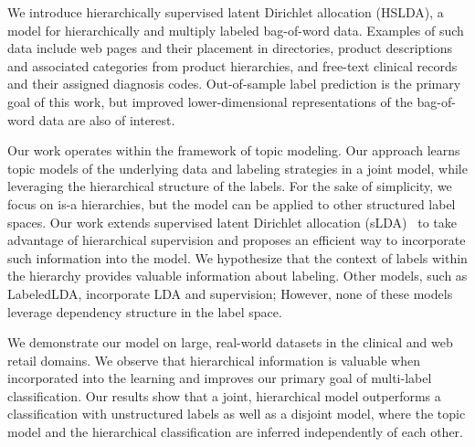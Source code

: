 

We introduce hierarchically supervised latent Dirichlet allocation (HSLDA), a
model for hierarchically and multiply labeled bag-of-word data.  Examples of
such data include web pages and their placement in directories, product
descriptions and associated categories from product hierarchies, and free-text
clinical records and their assigned diagnosis codes. Out-of-sample label
prediction is the primary goal of this work, but improved lower-dimensional
representations of the bag-of-word data are also of interest.

Our work operates within the framework of topic modeling. Our approach learns
topic models of the underlying data and labeling strategies in a joint model,
while leveraging the hierarchical structure of the labels. For the sake of
simplicity, we focus on is-a hierarchies, but the model can be
applied to other structured label spaces. Our work extends supervised latent Dirichlet
allocation (sLDA)~\cite{BleiMcAuliffe2008} to take advantage of hierarchical
supervision and proposes an efficient way to incorporate such information into the model. 
We hypothesize that the context of labels within
the hierarchy provides valuable information about labeling. Other models, such as LabeledLDA\citep{Ramage2009}, incorporate LDA and supervision; However, none of these models leverage dependency structure in the label space.

We demonstrate our model on large, real-world datasets in the clinical and web
retail domains. We observe that hierarchical information is valuable when
incorporated into the learning and improves our primary goal of multi-label
classification. Our results show that a joint, hierarchical model outperforms a
classification with unstructured labels as well as a disjoint model, where the
topic model and the hierarchical classification are inferred
independently of each other. 

